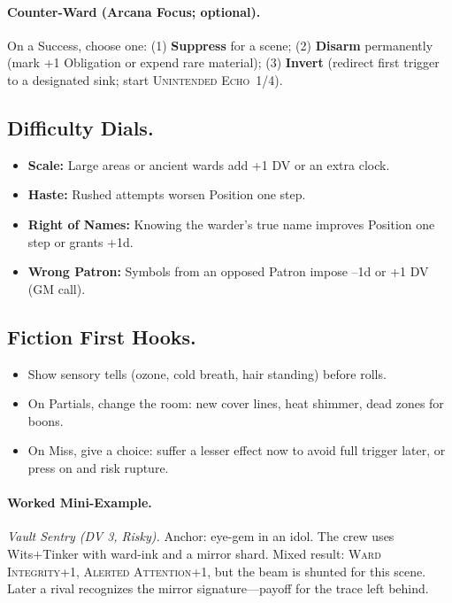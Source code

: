 \paragraph{Counter-Ward (Arcana Focus; optional).}
On a Success, choose one: (1) \textbf{Suppress} for a scene; (2) \textbf{Disarm} permanently (mark +1 Obligation or expend rare material); (3) \textbf{Invert} (redirect first trigger to a designated sink; start \textsc{Unintended Echo}~1/4).

\subsection{Difficulty Dials.}
\begin{itemize}
\item \textbf{Scale:} Large areas or ancient wards add +1 DV or an extra clock.
\item \textbf{Haste:} Rushed attempts worsen Position one step.
\item \textbf{Right of Names:} Knowing the warder’s true name improves Position one step or grants +1d.
\item \textbf{Wrong Patron:} Symbols from an opposed Patron impose –1d or +1 DV (GM call).
\end{itemize}

\subsection{Fiction First Hooks.}
\begin{itemize}
\item Show sensory tells (ozone, cold breath, hair standing) before rolls.
\item On Partials, change the room: new cover lines, heat shimmer, dead zones for boons.
\item On Miss, give a choice: suffer a lesser effect now to avoid full trigger later, or press on and risk rupture.
\end{itemize}

\paragraph{Worked Mini-Example.}
\emph{Vault Sentry (DV 3, Risky).} Anchor: eye-gem in an idol. The crew uses Wits+Tinker with ward-ink and a mirror shard. Mixed result: \textsc{Ward Integrity}+1, \textsc{Alerted Attention}+1, but the beam is shunted for this scene. Later a rival recognizes the mirror signature—payoff for the trace left behind.

